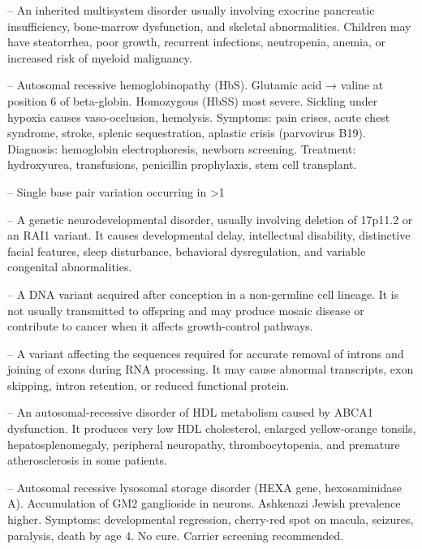 -- An inherited multisystem disorder usually involving exocrine pancreatic insufficiency, bone-marrow dysfunction, and skeletal abnormalities. Children may have steatorrhea, poor growth, recurrent infections, neutropenia, anemia, or increased risk of myeloid malignancy.

-- Autosomal recessive hemoglobinopathy (HbS). Glutamic acid → valine at position 6 of beta-globin. Homozygous (HbSS) most severe. Sickling under hypoxia causes vaso-occlusion, hemolysis. Symptoms: pain crises, acute chest syndrome, stroke, splenic sequestration, aplastic crisis (parvovirus B19). Diagnosis: hemoglobin electrophoresis, newborn screening. Treatment: hydroxyurea, transfusions, penicillin prophylaxis, stem cell transplant.

-- Single base pair variation occurring in >1%

-- A genetic neurodevelopmental disorder, usually involving deletion of 17p11.2 or an RAI1 variant. It causes developmental delay, intellectual disability, distinctive facial features, sleep disturbance, behavioral dysregulation, and variable congenital abnormalities.

-- A DNA variant acquired after conception in a non-germline cell lineage. It is not usually transmitted to offspring and may produce mosaic disease or contribute to cancer when it affects growth-control pathways.

-- A variant affecting the sequences required for accurate removal of introns and joining of exons during RNA processing. It may cause abnormal transcripts, exon skipping, intron retention, or reduced functional protein.

-- An autosomal-recessive disorder of HDL metabolism caused by ABCA1 dysfunction. It produces very low HDL cholesterol, enlarged yellow-orange tonsils, hepatosplenomegaly, peripheral neuropathy, thrombocytopenia, and premature atherosclerosis in some patients.

-- Autosomal recessive lysosomal storage disorder (HEXA gene, hexosaminidase A). Accumulation of GM2 ganglioside in neurons. Ashkenazi Jewish prevalence higher. Symptoms: developmental regression, cherry-red spot on macula, seizures, paralysis, death by age 4. No cure. Carrier screening recommended.

